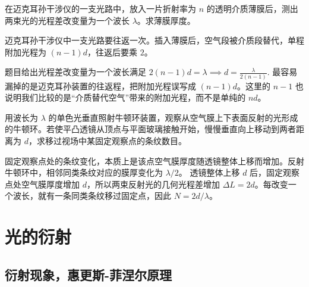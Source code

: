 \documentclass[lang=cn,11pt]{elegantbook}
\begin{document}
\begin{exercise}
在迈克耳孙干涉仪的一支光路中，放入一片折射率为 \(n\) 的透明介质薄膜后，测出两束光的光程差改变量为一个波长 \(\lambda\)。求薄膜厚度。
\end{exercise}

\begin{solution}
迈克耳孙干涉仪中一支光路要往返一次。插入薄膜后，空气段被介质段替代，单程附加光程为 \((n-1)d\)，往返后要乘 \(2\)。

题目给出光程差改变量为一个波长满足
 \(2(n-1)d=\lambda \implies d=\frac{\lambda}{2(n-1)}.\) 
最容易漏掉的是迈克耳孙装置的往返程，把附加光程误写成 \((n-1)d\)。这里的 \(n-1\) 也说明我们比较的是“介质替代空气”带来的附加光程，而不是单纯的 \(nd\)。
\end{solution}

\begin{exercise}
用波长为 \(\lambda\) 的单色光垂直照射牛顿环装置，观察从空气膜上下表面反射的光形成的牛顿环。若使平凸透镜从顶点与平面玻璃接触开始，慢慢垂直向上移动到两者距离为 \(d\)，求移过视场中某固定观察点的条纹数目。
\end{exercise}

\begin{solution}
固定观察点处的条纹变化，本质上是该点空气膜厚度随透镜整体上移而增加。反射牛顿环中，相邻同类条纹对应的膜厚变化为 \(\lambda/2\)。
透镜整体上移 \(d\) 后，固定观察点处空气膜厚度增加 \(d\)，所以两束反射光的几何光程差增加 \(\Delta L=2d\)。每改变一个波长，就有一条同类条纹移过固定点，因此 \(N=2d/\lambda\)。
\end{solution}


\chapter{光的衍射}

\section{衍射现象，惠更斯-菲涅尔原理}
\end{document}
